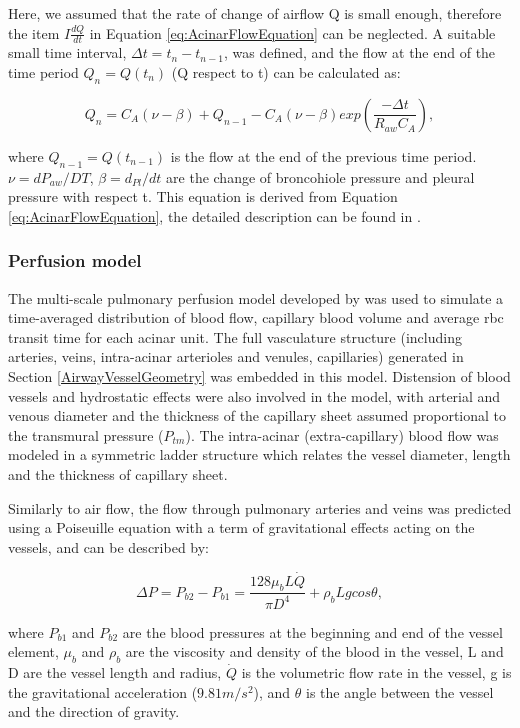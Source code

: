 Here, we assumed that the rate of change of airflow Q is small enough, therefore the item $I\frac{dQ}{dt}$ in Equation \ref{eq:AcinarFlowEquation} can be neglected. A suitable small time interval, $\Delta t = t_n - t_{n-1}$, was defined, and the flow at the end of the time period $Q_n = Q(t_n)$ (Q respect to t) can be calculated as:

\begin{equation}
 \label{eq:FlowRespectToTime}
 Q_n = C_A(\nu - \beta) + Q_{n-1} - C_A(\nu - \beta)exp(\frac{-\Delta t}{R_{aw}C_A}),
\end{equation}

\noindent where $Q_{n-1} = Q(t_{n-1})$ is the flow at the end of the previous time period. $\nu = dP_{aw}/DT$, $\beta = d_{Pl}/dt$ are the change of broncohiole pressure and pleural pressure with respect t. This equation is derived from Equation \ref{eq:AcinarFlowEquation}, the detailed description can be found in \cite{swan2012computational}.

\subsubsection{Perfusion model}
The multi-scale pulmonary perfusion model developed by \cite{clark2011interdependent} was used to simulate a time-averaged distribution of blood flow, capillary blood volume and average \gls{rbc} transit time for each acinar unit. The full vasculature structure (including arteries, veins, intra-acinar arterioles and venules, capillaries) generated in Section \ref{AirwayVesselGeometry} was embedded in this model. Distension of blood vessels and hydrostatic effects were also involved in the model, with arterial and venous diameter and the thickness of the capillary sheet assumed proportional to the transmural pressure ($P_{tm}$). The intra-acinar (extra-capillary) blood flow was modeled in a symmetric ladder structure which relates the vessel diameter, length and the thickness of capillary sheet.

Similarly to air flow, the flow through pulmonary arteries and veins was predicted using a Poiseuille equation  with a term of gravitational effects acting on the vessels, and can be described by:

\begin{equation}
 \label{eq:VesselFlow}
 \Delta P = P_{b2} - P_{b1} = \frac{128 \mu_bL\dot{Q}}{\pi D^{4}} + \rho_b Lgcos\theta,
\end{equation}

\noindent where $P_{b1}$ and $P_{b2}$ are the blood pressures at the beginning and end of the vessel element, $\mu_b$ and $\rho_b$ are the viscosity and density of the blood in the vessel, L and D are the vessel length and radius, $\dot{Q}$ is the volumetric flow rate in the vessel, g is the gravitational acceleration ($9.81m/s^2$), and $\theta$ is the angle between the vessel and the direction of gravity. 

